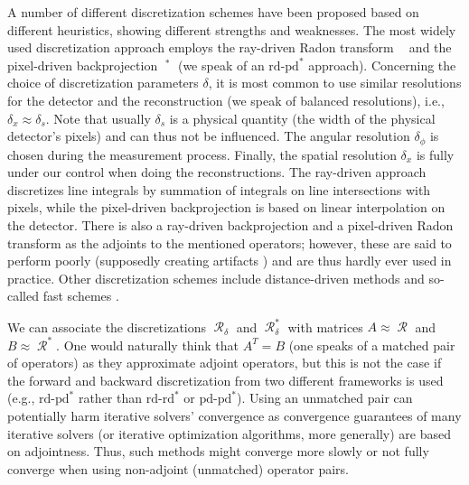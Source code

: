 \documentclass[11pt,reqno]{amsart}
\DeclareMathOperator{\Radon}{\mathcal{R}}
\DeclareMathOperator{\RayRadon}{\mathcal{R}^\mathrm{rd}_{\delta}}
\DeclareMathOperator{\PixelRadon}{\mathcal{R}^\mathrm{pd}_{\delta}}
\numberwithin{theorem}{section}
\theoremstyle{remark}
\begin{document}
A number of different discretization schemes have been proposed based on different heuristics, showing different strengths and weaknesses.
The most widely used discretization approach employs the ray-driven Radon transform $\RayRadon$  \cite{Siddon1985FastCO,Path_through_pixels,doi:10.1118/1.4761867} and the pixel-driven backprojection $\PixelRadon^*$ \cite{4331812,322963,Qiao2017ThreeNA,doi:10.1137/20M1326635} (we speak of an $\mathrm{rd}$-$\mathrm{pd}^*$ approach). Concerning the choice of discretization parameters $\delta$, it is most common to use similar resolutions for the detector and the reconstruction (we speak of balanced resolutions), i.e., $\delta_x\approx \delta_s$. Note that usually $\delta_s$ is a physical quantity (the width of the physical detector's pixels) and can thus not be influenced. The angular resolution $\delta_\phi$ is chosen during the measurement process. Finally, the spatial resolution $\delta_x$ is fully under our control when doing the reconstructions. The ray-driven approach discretizes line integrals by summation of integrals on line intersections with pixels, while the pixel-driven backprojection is based on linear interpolation on the detector.
There is also a ray-driven backprojection and a pixel-driven Radon transform as the adjoints to the mentioned operators; however, these are said to perform poorly (supposedly creating artifacts \cite{Man_2004,Xie_CUDA_paralelization_2015,Liu_GPU_DDP_2017}) and are thus hardly ever used in practice.
Other discretization schemes include distance-driven methods \cite{1239600,Man_2004} and so-called fast schemes \cite{averbuch2001fast,KINGSTON20062040}.



We can associate the discretizations $\Radon_\delta$ and $\Radon_\delta^*$ with matrices $A \approx \Radon$ and $B\approx \Radon^*$. One would naturally think that $A^T=B$ (one speaks of a matched pair of operators) as they approximate adjoint operators, but this is not the case if the forward and backward discretization from two different frameworks is used (e.g., $\mathrm{rd}$-$\mathrm{pd}^*$ rather than $\mathrm{rd}$-$\mathrm{rd}^*$ or $\mathrm{pd}$-$\mathrm{pd}^*$). Using an unmatched pair can potentially harm iterative solvers' convergence
 \cite{elfving2018unmatched,dong2019fixing,10.1007/s00245-022-09933-5} as convergence guarantees of many iterative solvers (or iterative optimization algorithms, more generally) are based on adjointness. Thus, such methods might converge more slowly or not fully converge when using non-adjoint (unmatched) operator pairs.
\end{document}
